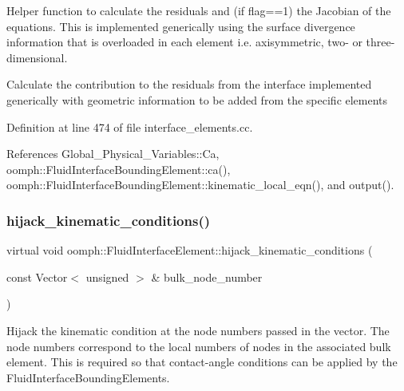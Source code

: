 Helper function to calculate the residuals and (if flag==1) the Jacobian of the equations. This is implemented generically using the surface divergence information that is overloaded in each element i.\+e. axisymmetric, two-\/ or three-\/dimensional. 

Calculate the contribution to the residuals from the interface implemented generically with geometric information to be added from the specific elements 

Definition at line 474 of file interface\+\_\+elements.\+cc.



References Global\+\_\+\+Physical\+\_\+\+Variables\+::\+Ca, oomph\+::\+Fluid\+Interface\+Bounding\+Element\+::ca(), oomph\+::\+Fluid\+Interface\+Bounding\+Element\+::kinematic\+\_\+local\+\_\+eqn(), and output().

\mbox{\label{classoomph_1_1FluidInterfaceElement_a7eb949642baee233779e4f92478ea341}} 
\subsubsection{\texorpdfstring{hijack\+\_\+kinematic\+\_\+conditions()}{hijack\_kinematic\_conditions()}}
{\footnotesize\ttfamily virtual void oomph\+::\+Fluid\+Interface\+Element\+::hijack\+\_\+kinematic\+\_\+conditions (\begin{DoxyParamCaption}\item[{const Vector$<$ unsigned $>$ \&}]{bulk\+\_\+node\+\_\+number }\end{DoxyParamCaption})\hspace{0.3cm}{\ttfamily [pure virtual]}}



Hijack the kinematic condition at the node numbers passed in the vector. The node numbers correspond to the local numbers of nodes in the associated bulk element. This is required so that contact-\/angle conditions can be applied by the Fluid\+Interface\+Bounding\+Elements. 



